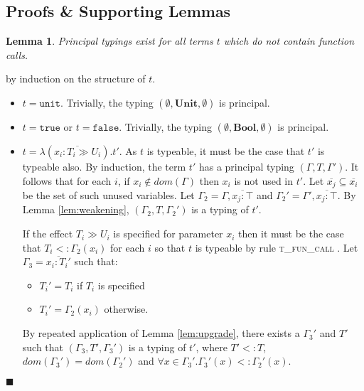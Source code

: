 \documentclass[preprint]{sigplanconf}
\newtheorem{lem}{Lemma}
\newcommand{\lemref}[1]{Lemma \ref{#1}}
\newcommand{\tfunc}{\textsc{t\_fun\_call} }
\newcommand{\unitv}{\mathtt{unit}}
\newcommand{\unitt}{\mathbf{Unit}}
\newcommand{\truev}{\mathtt{true}}
\newcommand{\falsev}{\mathtt{false}}
\newcommand{\boolt}{\mathbf{Bool}}
\newcommand{\funv}[4]{\lambda(\overline{#1 : #2 \gg #3}).#4}
\newcommand{\qed}{$\blacksquare$}
\newenvironment{proof}{\vspace{1ex}\noindent{\bf Proof}\hspace{0.5em}}
  {\hfill\qed\vspace{1ex}}
\begin{document}

\subsection{Proofs \& Supporting Lemmas}

\begin{lem}
\label{lem:principal_nofun}
Principal typings exist for all terms $t$ which do not contain function calls.
\end{lem}

\begin{proof}
by induction on the structure of $t$.

\begin{itemize}
\item $t = \unitv$. 
Trivially, the typing $(\emptyset, \unitt, \emptyset)$ is principal.

\item $t = \truev$ or $t = \falsev$. 
Trivially, the typing $(\emptyset, \boolt, \emptyset)$ is principal.

\item $t = \funv{x_i}{T_i}{U_i}{t'}$. 
As $t$ is typeable, it must be the case that $t'$ is typeable also.
By induction, the term $t'$ has a principal typing
$(\Gamma, T, \Gamma')$. It follows that for each $i$, if $x_i \notin dom(\Gamma)$
then $x_i$ is not used in $t'$. Let $\overline{x_j} \subseteq \overline{x_i}$
be the set of such unused variables.
Let $\Gamma_2 = \Gamma, \overline{x_j : \top}$ and 
$\Gamma_2' = \Gamma', \overline{x_j : \top}$.
By \lemref{lem:weakening}, $(\Gamma_2, T, \Gamma_2')$ is a typing of $t'$.

If the effect $T_i \gg U_i$ is specified for parameter $x_i$ then it
must be the case that $T_i <: \Gamma_2(x_i)$ for each $i$ so that 
$t$ is typeable by rule \tfunc.
Let $\Gamma_3 = \overline{x_i : T_i'}$ such that:

\begin{itemize}
\item $T_i' = T_i$ if $T_i$ is specified
\item $T_i' = \Gamma_2(x_i)$ otherwise.
\end{itemize}

By repeated application of \lemref{lem:upgrade}, there exists a $\Gamma_3'$ and 
$T'$ such that
$(\Gamma_3,T',\Gamma_3')$ is a typing of $t'$, where $T' <: T$,
$dom(\Gamma_3') = dom(\Gamma_2')$ and 
$\forall x \in \Gamma_3' . \Gamma_3'(x) <: \Gamma_2'(x)$.


\end{itemize}
\end{proof}
\end{document}
